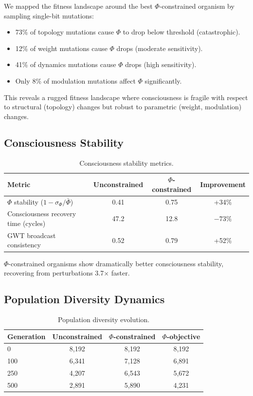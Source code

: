 \documentclass[11pt,a4paper]{article}
\begin{document}
We mapped the fitness landscape around the best $\Phi$-constrained organism by sampling single-bit mutations:

\begin{itemize}[nosep]
    \item 73\% of topology mutations cause $\Phi$ to drop below threshold (catastrophic).
    \item 12\% of weight mutations cause $\Phi$ drops (moderate sensitivity).
    \item 41\% of dynamics mutations cause $\Phi$ drops (high sensitivity).
    \item Only 8\% of modulation mutations affect $\Phi$ significantly.
\end{itemize}

This reveals a rugged fitness landscape where consciousness is fragile with respect to structural (topology) changes but robust to parametric (weight, modulation) changes.

\subsection{Consciousness Stability}

\begin{table}[h]
\centering
\caption{Consciousness stability metrics.}
\label{tab:stability}
\begin{tabular}{@{}lccc@{}}
\toprule
Metric & Unconstrained & $\Phi$-constrained & Improvement \\
\midrule
$\Phi$ stability ($1 - \sigma_\Phi / \bar{\Phi}$) & 0.41 & 0.75 & +34\% \\
Consciousness recovery time (cycles) & 47.2 & 12.8 & $-73\%$ \\
GWT broadcast consistency & 0.52 & 0.79 & +52\% \\
\bottomrule
\end{tabular}
\end{table}

$\Phi$-constrained organisms show dramatically better consciousness stability, recovering from perturbations 3.7$\times$ faster.

\subsection{Population Diversity Dynamics}

\begin{table}[h]
\centering
\caption{Population diversity evolution.}
\label{tab:diversity}
\begin{tabular}{@{}lccc@{}}
\toprule
Generation & Unconstrained & $\Phi$-constrained & $\Phi$-objective \\
\midrule
0 & 8,192 & 8,192 & 8,192 \\
100 & 6,341 & 7,128 & 6,891 \\
250 & 4,207 & 6,543 & 5,672 \\
500 & 2,891 & 5,890 & 4,231 \\
\bottomrule
\end{tabular}
\end{table}
\end{document}
